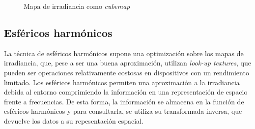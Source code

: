 
            \begin{figure}[H]
                \vspace{0.5cm}
                \centering
                \caption{Mapa de irradiancia como \textit{cubemap}}
            \end{figure}
            \singlespacing

            \subsection*{Esf\'ericos harm\'onicos}
            La t\'ecnica de esf\'ericos harm\'onicos \autocite{sh} supone una optimizaci\'on sobre los mapas de irradiancia,
            que, pese a ser una buena aproximaci\'on, utilizan \textit{look-up textures}, que pueden ser operaciones relativamente
            costosas en dispositivos con un rendimiento limitado.
            Los esf\'ericos harm\'onicos permiten una aproximaci\'on a la irradiancia debida al entorno comprimiendo la informaci\'on
            en una representaci\'on de espacio frente a frecuencias. De esta forma, la informaci\'on se almacena en la funci\'on de
            esf\'ericos harm\'onicos y para consultarla, se utiliza su transformada inversa, que devuelve los datos a su repesentaci\'on espacial.

